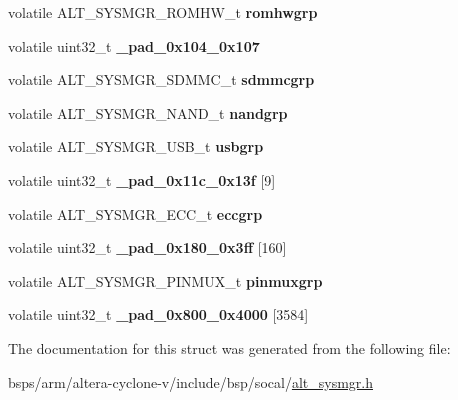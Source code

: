 \begin{DoxyCompactItemize}
\mbox{\label{structALT__SYSMGR__s_a4b7dd4f913f24662accbc4d1c130dca7}} 
volatile A\+L\+T\+\_\+\+S\+Y\+S\+M\+G\+R\+\_\+\+R\+O\+M\+H\+W\+\_\+t {\bfseries romhwgrp}
\item 
\mbox{\label{structALT__SYSMGR__s_aa5e7ccbae0a0c8cba34ebe526cdffb27}} 
volatile uint32\+\_\+t {\bfseries \+\_\+pad\+\_\+0x104\+\_\+0x107}
\item 
\mbox{\label{structALT__SYSMGR__s_a0890066ff5130dbb53f307236a3a479a}} 
volatile A\+L\+T\+\_\+\+S\+Y\+S\+M\+G\+R\+\_\+\+S\+D\+M\+M\+C\+\_\+t {\bfseries sdmmcgrp}
\item 
\mbox{\label{structALT__SYSMGR__s_a0a17d70acd39ebae4e22935883a36d46}} 
volatile A\+L\+T\+\_\+\+S\+Y\+S\+M\+G\+R\+\_\+\+N\+A\+N\+D\+\_\+t {\bfseries nandgrp}
\item 
\mbox{\label{structALT__SYSMGR__s_ae75947628bf3a6f732bc0dd9be5a0ced}} 
volatile A\+L\+T\+\_\+\+S\+Y\+S\+M\+G\+R\+\_\+\+U\+S\+B\+\_\+t {\bfseries usbgrp}
\item 
\mbox{\label{structALT__SYSMGR__s_a575cd32e4392cedc80841a5d976fd505}} 
volatile uint32\+\_\+t {\bfseries \+\_\+pad\+\_\+0x11c\+\_\+0x13f} \mbox{[}9\mbox{]}
\item 
\mbox{\label{structALT__SYSMGR__s_acf8d5408098545a0350be6cd20441d94}} 
volatile A\+L\+T\+\_\+\+S\+Y\+S\+M\+G\+R\+\_\+\+E\+C\+C\+\_\+t {\bfseries eccgrp}
\item 
\mbox{\label{structALT__SYSMGR__s_a23e6424b0d20dc49a4c857e6d27a1bc7}} 
volatile uint32\+\_\+t {\bfseries \+\_\+pad\+\_\+0x180\+\_\+0x3ff} \mbox{[}160\mbox{]}
\item 
\mbox{\label{structALT__SYSMGR__s_a0636220fe95bea1eb58da7577c9874a2}} 
volatile A\+L\+T\+\_\+\+S\+Y\+S\+M\+G\+R\+\_\+\+P\+I\+N\+M\+U\+X\+\_\+t {\bfseries pinmuxgrp}
\item 
\mbox{\label{structALT__SYSMGR__s_a7dff91dc25a6e388aac1eb5f5f480487}} 
volatile uint32\+\_\+t {\bfseries \+\_\+pad\+\_\+0x800\+\_\+0x4000} \mbox{[}3584\mbox{]}
\end{DoxyCompactItemize}


The documentation for this struct was generated from the following file\+:\begin{DoxyCompactItemize}
\item 
bsps/arm/altera-\/cyclone-\/v/include/bsp/socal/\mbox{\hyperlink{alt__sysmgr_8h}{alt\+\_\+sysmgr.\+h}}\end{DoxyCompactItemize}
